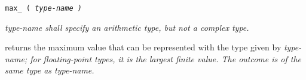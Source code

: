 
\tt{max_ (} \it{type-name} \tt{)}


\it{type-name} shall specify an arithmetic type, but not a complex type.


 returns the maximum value that can be represented with the type given
by \it{type-name}; for floating-point types, it is the largest finite value.
The outcome is of the same type as \it{type-name}.

